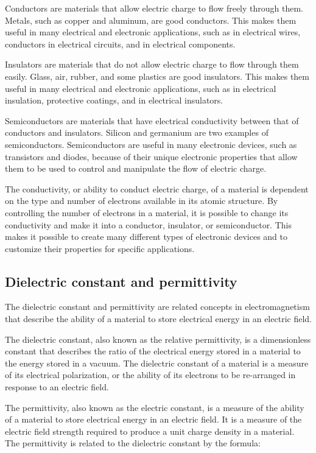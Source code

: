 \documentclass{article}
\begin{document}
Conductors are materials that allow electric charge to flow freely through
them. Metals, such as copper and aluminum, are good conductors. This makes them
useful in many electrical and electronic applications, such as in electrical
wires, conductors in electrical circuits, and in electrical components.

Insulators are materials that do not allow electric charge to flow through them
easily. Glass, air, rubber, and some plastics are good insulators. This makes
them useful in many electrical and electronic applications, such as in
electrical insulation, protective coatings, and in electrical insulators.

Semiconductors are materials that have electrical conductivity between that of
conductors and insulators. Silicon and germanium are two examples of
semiconductors. Semiconductors are useful in many electronic devices, such as
transistors and diodes, because of their unique electronic properties that
allow them to be used to control and manipulate the flow of electric charge.

The conductivity, or ability to conduct electric charge, of a material is
dependent on the type and number of electrons available in its atomic
structure. By controlling the number of electrons in a material, it is possible
to change its conductivity and make it into a conductor, insulator, or
semiconductor. This makes it possible to create many different types of
electronic devices and to customize their properties for specific applications.
\subsection{Dielectric constant and permittivity} %
\label{ssub:Dielectric constant and permittivity}
The dielectric constant and permittivity are related concepts in
electromagnetism that describe the ability of a material to store electrical
energy in an electric field.

The dielectric constant, also known as the relative permittivity, is a
dimensionless constant that describes the ratio of the electrical energy stored
in a material to the energy stored in a vacuum. The dielectric constant of a
material is a measure of its electrical polarization, or the ability of its
electrons to be re-arranged in response to an electric field.

The permittivity, also known as the electric constant, is a measure of the
ability of a material to store electrical energy in an electric field. It is a
measure of the electric field strength required to produce a unit charge
density in a material. The permittivity is related to the dielectric constant
by the formula:
\end{document}
